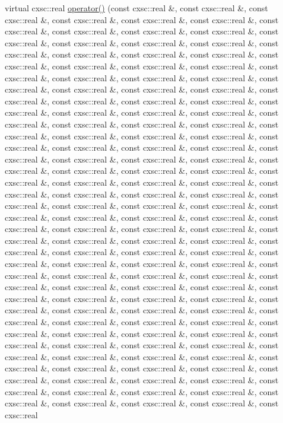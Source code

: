\begin{DoxyCompactItemize}
virtual cxsc\-::real \hyperlink{classsubpavings_1_1MappedFobj1000D_a3f1bac6f34725fcfb6c231bee7bede58}{operator()} (const cxsc\-::real \&, const cxsc\-::real \&, const cxsc\-::real \&, const cxsc\-::real \&, const cxsc\-::real \&, const cxsc\-::real \&, const cxsc\-::real \&, const cxsc\-::real \&, const cxsc\-::real \&, const cxsc\-::real \&, const cxsc\-::real \&, const cxsc\-::real \&, const cxsc\-::real \&, const cxsc\-::real \&, const cxsc\-::real \&, const cxsc\-::real \&, const cxsc\-::real \&, const cxsc\-::real \&, const cxsc\-::real \&, const cxsc\-::real \&, const cxsc\-::real \&, const cxsc\-::real \&, const cxsc\-::real \&, const cxsc\-::real \&, const cxsc\-::real \&, const cxsc\-::real \&, const cxsc\-::real \&, const cxsc\-::real \&, const cxsc\-::real \&, const cxsc\-::real \&, const cxsc\-::real \&, const cxsc\-::real \&, const cxsc\-::real \&, const cxsc\-::real \&, const cxsc\-::real \&, const cxsc\-::real \&, const cxsc\-::real \&, const cxsc\-::real \&, const cxsc\-::real \&, const cxsc\-::real \&, const cxsc\-::real \&, const cxsc\-::real \&, const cxsc\-::real \&, const cxsc\-::real \&, const cxsc\-::real \&, const cxsc\-::real \&, const cxsc\-::real \&, const cxsc\-::real \&, const cxsc\-::real \&, const cxsc\-::real \&, const cxsc\-::real \&, const cxsc\-::real \&, const cxsc\-::real \&, const cxsc\-::real \&, const cxsc\-::real \&, const cxsc\-::real \&, const cxsc\-::real \&, const cxsc\-::real \&, const cxsc\-::real \&, const cxsc\-::real \&, const cxsc\-::real \&, const cxsc\-::real \&, const cxsc\-::real \&, const cxsc\-::real \&, const cxsc\-::real \&, const cxsc\-::real \&, const cxsc\-::real \&, const cxsc\-::real \&, const cxsc\-::real \&, const cxsc\-::real \&, const cxsc\-::real \&, const cxsc\-::real \&, const cxsc\-::real \&, const cxsc\-::real \&, const cxsc\-::real \&, const cxsc\-::real \&, const cxsc\-::real \&, const cxsc\-::real \&, const cxsc\-::real \&, const cxsc\-::real \&, const cxsc\-::real \&, const cxsc\-::real \&, const cxsc\-::real \&, const cxsc\-::real \&, const cxsc\-::real \&, const cxsc\-::real \&, const cxsc\-::real \&, const cxsc\-::real \&, const cxsc\-::real \&, const cxsc\-::real \&, const cxsc\-::real \&, const cxsc\-::real \&, const cxsc\-::real \&, const cxsc\-::real \&, const cxsc\-::real \&, const cxsc\-::real \&, const cxsc\-::real \&, const cxsc\-::real \&, const cxsc\-::real \&, const cxsc\-::real \&, const cxsc\-::real \&, const cxsc\-::real \&, const cxsc\-::real \&, const cxsc\-::real \&, const cxsc\-::real \&, const cxsc\-::real \&, const cxsc\-::real \&, const cxsc\-::real \&, const cxsc\-::real \&, const cxsc\-::real \&, const cxsc\-::real \&, const cxsc\-::real \&, const cxsc\-::real \&, const cxsc\-::real \&, const cxsc\-::real \&, const cxsc\-::real \&, const cxsc\-::real \&, const cxsc\-::real \&, const cxsc\-::real \&, const cxsc\-::real \&, const cxsc\-::real \&, const cxsc\-::real \&, const cxsc\-::real \&, const cxsc\-::real \&, const cxsc\-::real \&, const cxsc\-::real \&, const cxsc\-::real \&, const cxsc\-::real \&, const cxsc\-::real \&, const cxsc\-::real \&, const cxsc\-::real \&, const cxsc\-::real \&, const cxsc\-::real \&, const cxsc\-::real \&, const cxsc\-::real \&, const cxsc\-::real \&, const cxsc\-::real \&, const cxsc\-::real \&, const cxsc\-::real 
\end{DoxyCompactItemize}
